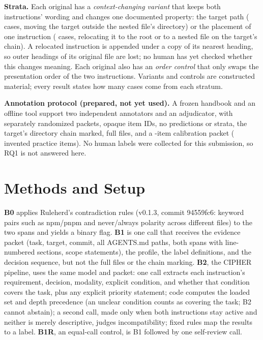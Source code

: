 \textbf{Strata.} Each original has a \emph{context-changing variant} that keeps both instructions' wording and changes
one documented property: the target path (\NVarTarget{} cases, moving the target outside the nested file's directory)
or the placement of one instruction (\NVarPlacement{} cases, relocating it to the root or to a nested file on the
target's chain). A relocated instruction is appended under a copy of its nearest heading, so outer headings of its
original file are lost; no human has yet checked whether this changes meaning. Each original also has an
\emph{order control} that only swaps the presentation order of the two instructions. Variants and controls are
constructed material; every result states how many cases come from each stratum.

\textbf{Annotation protocol (prepared, not yet used).} A frozen handbook and an offline tool support two independent
annotators and an adjudicator, with separately randomized packets, opaque item IDs, no predictions or strata, the
target's directory chain marked, full files, and a \NCalItems-item calibration packet (\NPracticeWord{} invented
practice items). No human labels were collected for this submission, so RQ1 is not answered here.

\section{Methods and Setup}\label{sec:methods}
\textbf{B0} applies Ruleherd's contradiction rules (v0.1.3, commit 94559fc6: keyword pairs such as npm/pnpm and
never/always polarity across different files) to the two spans and yields a binary flag. \textbf{B1} is one call that
receives the evidence packet (task, target, commit, all AGENTS.md paths, both spans with line-numbered sections, scope
statements), the profile, the label definitions, and the decision sequence, but not the full files or the chain
marking. \textbf{B2}, the CIPHER pipeline, uses the same model and packet: one call extracts each instruction's
requirement, decision, modality, explicit condition, and whether that condition covers the task, plus any explicit
priority statement; code computes the loaded set and depth precedence (an unclear condition counts as covering the
task; B2 cannot abstain); a second call, made only when both instructions stay active and neither is merely
descriptive, judges incompatibility; fixed rules map the results to a label. \textbf{B1R}, an equal-call control, is
B1 followed by one self-review call.

